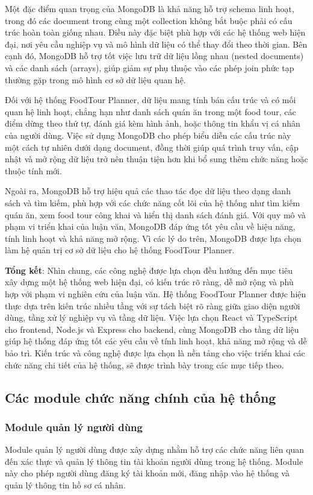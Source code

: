 Một đặc điểm quan trọng của MongoDB là khả năng hỗ trợ schema linh hoạt, trong đó các
document trong cùng một collection không bắt buộc phải có cấu trúc hoàn toàn giống nhau.
Điều này đặc biệt phù hợp với các hệ thống web hiện đại, nơi yêu cầu nghiệp vụ và mô hình
dữ liệu có thể thay đổi theo thời gian. Bên cạnh đó, MongoDB hỗ trợ tốt việc lưu trữ dữ liệu
lồng nhau (nested documents) và các danh sách (arrays), giúp giảm sự phụ thuộc vào các
phép join phức tạp thường gặp trong mô hình cơ sở dữ liệu quan hệ.

Đối với hệ thống FoodTour Planner, dữ liệu mang tính bán cấu trúc và có mối quan hệ linh
hoạt, chẳng hạn như danh sách quán ăn trong một food tour, các điểm dừng theo thứ tự,
đánh giá kèm hình ảnh, hoặc thông tin khẩu vị cá nhân của người dùng. Việc sử dụng
MongoDB cho phép biểu diễn các cấu trúc này một cách tự nhiên dưới dạng document,
đồng thời giúp quá trình truy vấn, cập nhật và mở rộng dữ liệu trở nên thuận tiện hơn khi
bổ sung thêm chức năng hoặc thuộc tính mới.

Ngoài ra, MongoDB hỗ trợ hiệu quả các thao tác đọc dữ liệu theo dạng danh sách và tìm
kiếm, phù hợp với các chức năng cốt lõi của hệ thống như tìm kiếm quán ăn, xem food tour
công khai và hiển thị danh sách đánh giá. Với quy mô và phạm vi triển khai của luận văn,
MongoDB đáp ứng tốt yêu cầu về hiệu năng, tính linh hoạt và khả năng mở rộng. Vì các lý
do trên, MongoDB được lựa chọn làm hệ quản trị cơ sở dữ liệu cho hệ thống FoodTour
Planner.


\textbf{Tổng kết}: Nhìn chung, các công nghệ được lựa chọn đều hướng đến mục tiêu xây dựng một hệ thống web hiện đại, có kiến trúc rõ ràng, dễ mở rộng và phù hợp với phạm vi nghiên cứu của luận văn. Hệ thống FoodTour Planner được hiện thực dựa trên kiến trúc nhiều tầng với sự tách biệt rõ ràng giữa giao diện người dùng, tầng xử lý nghiệp vụ và tầng dữ liệu.
Việc lựa chọn React và TypeScript cho frontend, Node.js và Express cho backend, cùng MongoDB cho tầng dữ liệu giúp hệ thống đáp ứng tốt các yêu cầu về tính linh hoạt, khả năng mở rộng và dễ bảo trì. Kiến trúc và công nghệ được lựa chọn là nền tảng cho việc triển khai các chức năng chi tiết của hệ thống, sẽ được trình bày trong các mục tiếp theo.

\subsection{Các module chức năng chính của hệ thống}
\subsubsection{Module quản lý người dùng}
Module quản lý người dùng được xây dựng nhằm hỗ trợ các chức năng liên quan đến
xác thực và quản lý thông tin tài khoản người dùng trong hệ thống. Module này cho phép người dùng đăng ký tài khoản mới, đăng nhập vào hệ thống và quản lý thông tin hồ sơ cá nhân.

